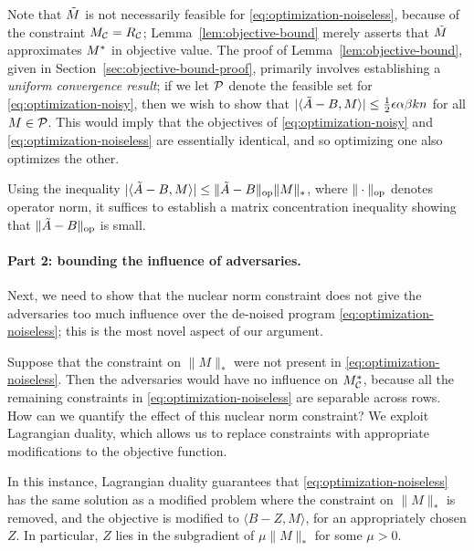 Note that $\tilde{M}$ is not necessarily feasible for \eqref{eq:optimization-noiseless}, 
because of the constraint $M_{\mathcal{C}} = R_{\mathcal{C}}$; Lemma~\ref{lem:objective-bound} 
merely asserts that $\tilde{M}$ approximates $M^*$ in objective value. The proof of 
Lemma~\ref{lem:objective-bound}, given in Section~\ref{sec:objective-bound-proof}, 
primarily involves establishing a 
\emph{uniform convergence result}; if we let $\mathcal{P}$ denote the feasible set for 
\eqref{eq:optimization-noisy}, then we wish to show that 
$|\langle \tilde{A} - B, M \rangle| \leq \frac{1}{2}\epsilon \alpha\beta kn$ for all 
$M \in \mathcal{P}$. This would imply that the objectives of 
\eqref{eq:optimization-noisy} and \eqref{eq:optimization-noiseless} are 
essentially identical, and so optimizing one also optimizes the other.

Using the inequality $|\langle \tilde{A} - B, M \rangle| \leq \|\tilde{A}-B\|_{\mathrm{op}}\|M\|_*$, 
where $\|\cdot\|_{\mathrm{op}}$ denotes operator norm, it suffices to establish a matrix 
concentration inequality showing that $\|\tilde{A} - B\|_{\mathrm{op}}$ is small. 

\paragraph{Part 2: bounding the influence of adversaries.} 
Next, we need to show that the nuclear norm constraint does 
not give the adversaries too much influence over the de-noised program 
\eqref{eq:optimization-noiseless}; this is the most novel aspect 
of our argument.

Suppose that the constraint on $\|M\|_*$ were not present in 
\eqref{eq:optimization-noiseless}. Then the adversaries would have 
no influence on $M^*_{\mathcal{C}}$, because all the remaining constraints 
in \eqref{eq:optimization-noiseless} are separable across rows. 
How can we quantify the effect of this nuclear norm constraint?
We exploit Lagrangian duality, which allows us to replace constraints 
with appropriate modifications to the objective function.



In this instance, 
Lagrangian duality guarantees that \eqref{eq:optimization-noiseless} has the 
same solution as a modified problem where the constraint on $\|M\|_*$ is removed, 
and the objective is modified to $\langle B - Z, M \rangle$, for an appropriately 
chosen $Z$. In particular, $Z$ lies in the subgradient of 
$\mu \|M\|_*$ for some $\mu > 0$.

